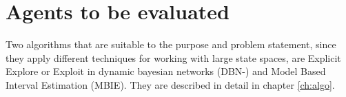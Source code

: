 \section{Agents to be evaluated}
Two algorithms that are suitable to the purpose and problem statement, since they apply different techniques for working with large state spaces, are Explicit Explore or Exploit in dynamic bayesian networks (DBN-\etre) and Model Based Interval Estimation (MBIE). They are described in detail in chapter \ref{ch:algo}. 





